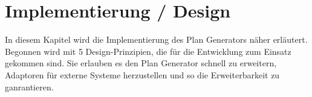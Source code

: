 \chapter{Implementierung / Design}

In diesem Kapitel wird die Implementierung des Plan Generators näher erläutert. Begonnen wird mit 5 Design-Prinzipien, die für die Entwicklung zum Einsatz gekommen sind. Sie erlauben es den Plan Generator schnell zu erweitern, Adaptoren für externe Systeme herzustellen und so die Erweiterbarkeit zu ganrantieren.










